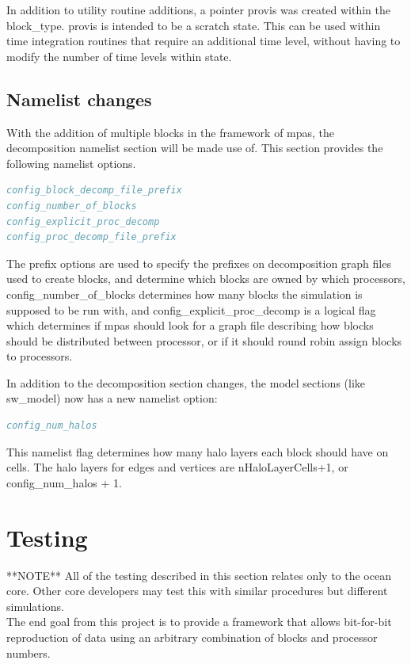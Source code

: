 \documentclass[11pt]{report}
\begin{document}
In addition to utility routine additions, a pointer provis was created within the block\_type. provis is intended to be a scratch state. This can be used within time integration routines that require an additional time level, without having to modify the number of time levels within state. 

\section{Namelist changes}
With the addition of multiple blocks in the framework of mpas, the decomposition namelist section will be made use of. This section provides the following namelist options.
\begin{lstlisting}[language=fortran,escapechar=@,frame=single]
config_block_decomp_file_prefix
config_number_of_blocks
config_explicit_proc_decomp
config_proc_decomp_file_prefix
\end{lstlisting}

The prefix options are used to specify the prefixes on decomposition graph files used to create blocks, and determine which blocks are owned by which processors, config\_number\_of\_blocks determines how many blocks the simulation is supposed to be run with, and config\_explicit\_proc\_decomp is a logical flag which determines if mpas should look for a graph file describing how blocks should be distributed between processor, or if it should round robin assign blocks to processors.

In addition to the decomposition section changes, the model sections (like sw\_model) now has a new namelist option:

\begin{lstlisting}[language=fortran,escapechar=@,frame=single]
config_num_halos
\end{lstlisting}

This namelist flag determines how many halo layers each block should have on cells. The halo layers for edges and vertices are nHaloLayerCells+1, or config\_num\_halos + 1.

\chapter{Testing}
**NOTE**
All of the testing described in this section relates only to the ocean core.
Other core developers may test this with similar procedures but different
simulations. \\

The end goal from this project is to provide a framework that allows
bit-for-bit reproduction of data using an arbitrary combination of blocks and
processor numbers.
\end{document}
